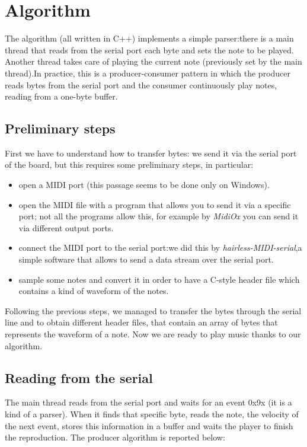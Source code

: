 \documentclass[12pt]{article}
\begin{document}
\section{Algorithm} \label{sec:algorithm}
The algorithm (all written in C++) implements a simple parser:there is a main thread that reads from the serial port each byte and sets the note to be played. Another thread takes care of playing the current note (previously set by the main thread).In practice, this is a producer-consumer pattern in which the producer reads bytes from the serial port and the consumer continuously play notes, reading from a one-byte buffer.

\subsection{Preliminary steps}
First we have to understand how to transfer bytes: we send it via the serial port of the board, but this requires some preliminary steps, in particular:
\begin{itemize}
	\item open a MIDI port (this passage seems to be done only on Windows).
	\item open the MIDI file with a program that allows you to send it via a specific port; not all the programs allow this, for example by \textit{MidiOx}  you can send it via different output ports.
	\item connect the MIDI port to the serial port:we did this by \textit{hairless-MIDI-serial},a simple software that allows to send a data stream over the serial port.
	\item sample some notes and convert it in order to have a C-style header file which contains a kind of waveform of the notes.
\end{itemize}
Following the previous steps, we managed to transfer the bytes through the serial line and to obtain different header files, that contain an array of bytes that represents the waveform of a note. Now we are ready to play music thanks to our algorithm.

\subsection{Reading from the serial}
The main thread reads from the serial port and waits for an event 0x9x (it is a kind of a parser). When it finds that specific byte, reads the note, the velocity of the next event, stores this information in a buffer and waits the player to finish the reproduction. The producer algorithm is reported below:
\end{document}
